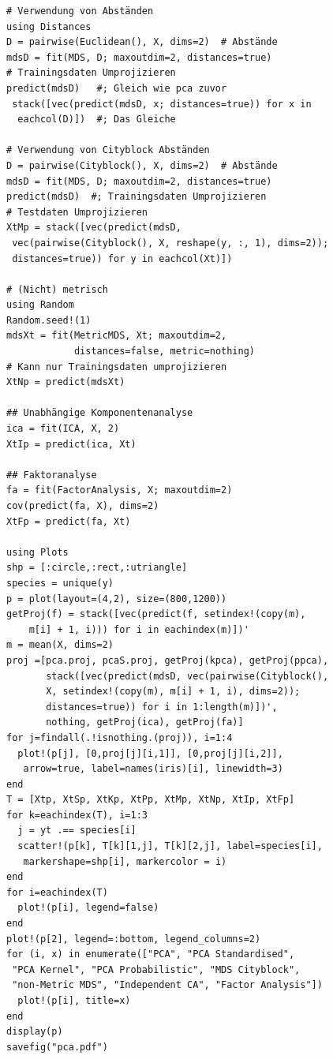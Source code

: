 \documentclass[10pt,twocolumn]{scrartcl}
\begin{document}
\begin{lstlisting}
# Verwendung von Abständen
using Distances
D = pairwise(Euclidean(), X, dims=2)  # Abstände
mdsD = fit(MDS, D; maxoutdim=2, distances=true)
# Trainingsdaten Umprojizieren
predict(mdsD)   #; Gleich wie pca zuvor
 stack([vec(predict(mdsD, x; distances=true)) for x in
  eachcol(D)])  #; Das Gleiche

# Verwendung von Cityblock Abständen
D = pairwise(Cityblock(), X, dims=2)  # Abstände
mdsD = fit(MDS, D; maxoutdim=2, distances=true)
predict(mdsD)  #; Trainingsdaten Umprojizieren
# Testdaten Umprojizieren
XtMp = stack([vec(predict(mdsD,
 vec(pairwise(Cityblock(), X, reshape(y, :, 1), dims=2));
 distances=true)) for y in eachcol(Xt)])

# (Nicht) metrisch
using Random
Random.seed!(1)
mdsXt = fit(MetricMDS, Xt; maxoutdim=2,
            distances=false, metric=nothing)
# Kann nur Trainingsdaten umprojizieren
XtNp = predict(mdsXt)

## Unabhängige Komponentenanalyse
ica = fit(ICA, X, 2)
XtIp = predict(ica, Xt)

## Faktoranalyse
fa = fit(FactorAnalysis, X; maxoutdim=2)
cov(predict(fa, X), dims=2)
XtFp = predict(fa, Xt)

using Plots
shp = [:circle,:rect,:utriangle]
species = unique(y)
p = plot(layout=(4,2), size=(800,1200))
getProj(f) = stack([vec(predict(f, setindex!(copy(m),
    m[i] + 1, i))) for i in eachindex(m)])'
m = mean(X, dims=2)
proj =[pca.proj, pcaS.proj, getProj(kpca), getProj(ppca),
       stack([vec(predict(mdsD, vec(pairwise(Cityblock(),
       X, setindex!(copy(m), m[i] + 1, i), dims=2));
       distances=true)) for i in 1:length(m)])',
       nothing, getProj(ica), getProj(fa)]
for j=findall(.!isnothing.(proj)), i=1:4
  plot!(p[j], [0,proj[j][i,1]], [0,proj[j][i,2]],
   arrow=true, label=names(iris)[i], linewidth=3)
end
T = [Xtp, XtSp, XtKp, XtPp, XtMp, XtNp, XtIp, XtFp]
for k=eachindex(T), i=1:3
  j = yt .== species[i]
  scatter!(p[k], T[k][1,j], T[k][2,j], label=species[i],
   markershape=shp[i], markercolor = i)
end
for i=eachindex(T)
  plot!(p[i], legend=false)
end
plot!(p[2], legend=:bottom, legend_columns=2)
for (i, x) in enumerate(["PCA", "PCA Standardised",
 "PCA Kernel", "PCA Probabilistic", "MDS Cityblock",
 "non-Metric MDS", "Independent CA", "Factor Analysis"])
  plot!(p[i], title=x)
end
display(p)
savefig("pca.pdf")
\end{lstlisting}
\end{document}
